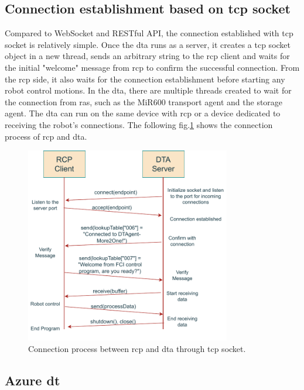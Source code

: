 \subsection{Connection establishment based on \gls{tcp} socket} \label{chap: tcpsocket}
Compared to WebSocket and RESTful API, the connection established with \gls{tcp} 
socket is relatively simple. Once the \gls{dta} runs as a server, it creates a \gls{tcp} socket 
object in a new thread, sends an arbitrary string to the \gls{rcp} client and 
waits for the initial "welcome" message from \gls{rcp} 
to confirm the successful connection. 
From the \gls{rcp} side, it also waits for the connection establishment before 
starting any robot control motions.  
In the \gls{dta}, there are multiple threads created to wait for the connection 
from \gls{ras}, such as the MiR600 transport agent and the storage agent. 
The \gls{dta} can run on the same device with \gls{rcp} or a device dedicated 
to receiving the robot's connections. The following fig.\ref{fig: tcpRCPDTA} shows the connection 
process of \gls{rcp} and \gls{dta}. 

\begin{figure}[htb]
    \centering
\includegraphics[width=0.8\textwidth]{figures/methodology/tcpsocket.pdf}
\caption{Connection process between \gls{rcp} and \gls{dta} 
through \gls{tcp} socket. \label{fig: tcpRCPDTA}}
\end{figure}





\subsection{Azure \gls{dt}}
